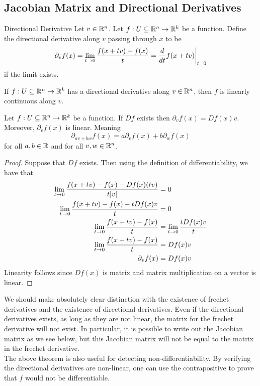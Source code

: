 \documentclass[a4paper]{article}
\begin{document}
\subsection{Jacobian Matrix and Directional Derivatives}
\begin{defn}{Directional Derivative}{} Let $v\in\mathbb{R}^n$. Let $f:U\subseteq\mathbb{R}^n\to\mathbb{R}^k$ be a function. Define the directional derivative along $v$ passing through $x$ to be $$\partial_vf(x)=\lim_{t\to 0}\frac{f(x+tv)-f(x)}{t}=\frac{d}{dt}f(x+tv)\bigg{|}_{t=0}$$ if the limit exists. 
\end{defn}

\begin{prp} If $f:U\subseteq\mathbb{R}^n\to\mathbb{R}^k$ has a directional derivative along $v\in\mathbb{R}^n$, then $f$ is linearly continuous along $v$. 
\end{prp}

\begin{prp}{}{} Let $f:U\subseteq\mathbb{R}^n\to\mathbb{R}^k$ be a function. If $Df$ exists then $\partial_vf(x)=Df(x)v$. Moreover, $\partial_vf(x)$ is linear. Meaning $$\partial_{av+bw}f(x)=a\partial_vf(x)+b\partial_wf(x)$$ for all $a,b\in\mathbb{R}$ and for all $v,w\in\mathbb{R}^n$. 
\begin{proof}
Suppose that $Df$ exists. Then using the definition of differentiability, we have that 
\begin{align*}
\lim_{t\to 0}\frac{f(x+tv)-f(x)-Df(x)(tv)}{t\abs{v}}&=0\\
\lim_{t\to 0}\frac{f(x+tv)-f(x)-tDf(x)v}{t}&=0\\
\lim_{t\to 0}\frac{f(x+tv)-f(x)}{t}&=\lim_{t\to 0}\frac{tDf(x)v}{t}\\
\lim_{t\to 0}\frac{f(x+tv)-f(x)}{t}&=Df(x)v\\
\partial_vf(x)&=Df(x)v
\end{align*}
Linearity follows since $Df(x)$ is matrix and matrix multiplication on a vector is linear. 
\end{proof}
\end{prp}

We should make absolutely clear distinction with the existence of frechet derivatives and the existence of directional derivatives. Even if the directional derivatives exists, as long as they are not linear, the matrix for the frechet derivative will not exist. In particular, it is possible to write out the Jacobian matrix as we see below, but this Jacobian matrix will not be equal to the matrix in the frechet derivative. \\

The above theorem is also useful for detecting non-differentiability. By verifying the directional derivatives are non-linear, one can use the contrapositive to prove that $f$ would not be differentiable. 
\end{document}
